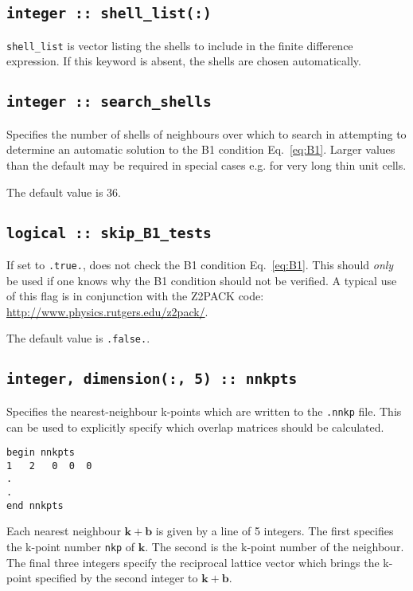 \subsection[shell\_list]{\tt integer :: shell\_list(:)}

\verb#shell_list# is vector listing the shells
to include in the finite difference expression. If this keyword is
absent, the shells are chosen automatically.

\subsection[search\_shells]{\tt integer :: search\_shells}

Specifies the number of shells of neighbours over which to search in
attempting to determine an automatic solution to the B1 condition
Eq.~\ref{eq:B1}. Larger values than the default may be required in special
cases e.g. for very long thin unit cells.

The default value is 36.

\subsection[skip\_B1\_tests]{\tt logical :: skip\_B1\_tests}

If set to \texttt{.true.}, does not check the B1 condition
Eq.~\ref{eq:B1}. This should \emph{only} be used if one knows
why the B1 condition should not be verified. A typical use of this
flag is in conjunction with the Z2PACK code:
\url{http://www.physics.rutgers.edu/z2pack/}.

The default value is \texttt{.false.}.

\subsection[nnkpts]{\tt integer, dimension(:, 5) :: nnkpts}

Specifies the nearest-neighbour k-points which are written to the \texttt{.nnkp} file. This can be used to explicitly specify which overlap matrices should be calculated.

\begin{verbatim}
begin nnkpts
1   2   0  0  0
.
.
end nnkpts
\end{verbatim}

Each nearest neighbour $\mathbf{k + b}$ is given by a line of 5 integers. The first specifies the k-point number \texttt{nkp} of $\mathbf{k}$. The second is the k-point number of the neighbour. The final three integers specify the reciprocal lattice vector which brings the k-point specified by the second integer to $\mathbf{k + b}$.

